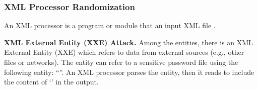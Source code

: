 \subsubsection{XML Processor Randomization}
An XML processor is a program or module that  an input XML file .

\noindent
{\bf XML External Entity (XXE) Attack.}
Among the entities, there is an XML External Entity (XXE) which refers to data from external sources (e.g., other files or networks).
The entity can refer to a sensitive password file using the following entity: ``''.
An XML processor parses the entity, then it reads to include the content of `' in the output. 



